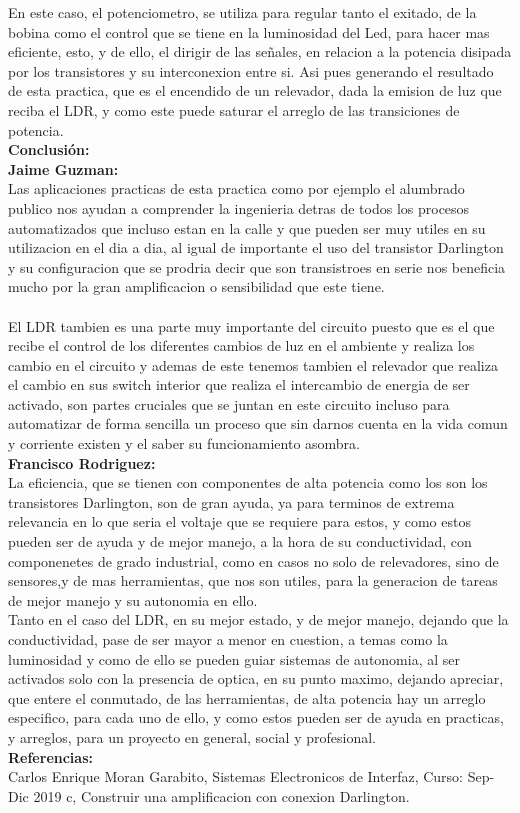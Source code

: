 \documentclass[12pt,a4paper]{article}
\begin{document}
En este caso, el potenciometro, se utiliza para regular tanto el exitado, de la bobina como el control que se tiene en la luminosidad del Led, para hacer mas eficiente, esto, y de ello, el dirigir de las señales, en relacion a la potencia disipada por los transistores y su interconexion entre si. Asi pues generando el resultado de esta practica, que es el encendido de un relevador, dada la emision de luz que reciba el LDR, y como este puede saturar el arreglo de las transiciones de potencia.\\

\textbf{\Large Conclusión:}\\

\textbf{Jaime Guzman:}\\
Las aplicaciones practicas de esta practica como por ejemplo el alumbrado publico nos ayudan a comprender la ingenieria detras de todos los procesos automatizados que incluso estan en la calle y que pueden ser muy utiles en su utilizacion en el dia a dia, al igual de importante el uso del transistor Darlington y su configuracion que  se prodria decir que son transistroes en serie nos beneficia mucho por la gran amplificacion o sensibilidad que este tiene.\\\\
El LDR tambien es una parte muy importante del circuito puesto que es el que recibe el control de los diferentes  cambios de luz en el ambiente y realiza los cambio en el circuito y ademas de este tenemos tambien el relevador que realiza el cambio en sus switch interior que realiza el intercambio de energia de ser activado, son partes cruciales que se juntan en este circuito incluso para automatizar de forma sencilla un proceso que sin darnos cuenta en la vida comun y corriente existen y el saber su funcionamiento asombra.\\

\textbf{Francisco Rodriguez:}\\
La eficiencia, que se tienen con componentes de alta potencia como los son los transistores Darlington, son de gran ayuda, ya para terminos de extrema relevancia en lo que seria el voltaje que se requiere para estos, y como estos pueden ser de ayuda y de mejor manejo, a la hora de su conductividad, con componenetes de grado industrial, como en casos no solo de relevadores, sino de sensores,y de mas herramientas, que nos son utiles, para la generacion de tareas de mejor manejo y su autonomia en ello.\\
Tanto en el caso del LDR, en su mejor estado, y de mejor manejo, dejando que la conductividad, pase de ser mayor a menor en cuestion, a temas como la luminosidad y como de ello se pueden guiar sistemas de autonomia, al ser activados solo con la presencia de optica, en su punto maximo, dejando apreciar, que entere el conmutado, de las herramientas, de alta potencia hay un arreglo especifico, para cada uno de ello, y como estos pueden ser de ayuda en practicas, y arreglos, para un proyecto en general, social y profesional.\\

\textbf{\Large Referencias:}\\

Carlos Enrique Moran Garabito, Sistemas Electronicos de Interfaz, Curso: Sep-Dic 2019 c, Construir una amplificacion con conexion Darlington.
\end{document}
